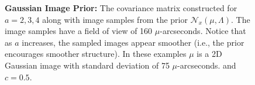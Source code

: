 \begin{figure}[tb]
\begin{center}
\begin{tabular}{  c | c | c   }
                       			\\            	
                       		\end{tabular}
                       		\caption{\footnotesize{{\bf Gaussian Image Prior:} The covariance matrix constructed for $a=2,3,4$ along with image samples from the prior  $\mathcal{N}_x(\mu, \Lambda)$. The image samples have a field of view of 160 $\mu$-arcseconds. Notice that as $a$ increases, the sampled images appear smoother (i.e., the prior encourages smoother structure). In these examples $\mu$ is a 2D Gaussian image with standard deviation of 75 $\mu$-arcseconds. and $c=0.5$. 
                       			}}
                       			\label{fig:priorsamples}
\end{center}
\vspace{-.2in}
\end{figure}